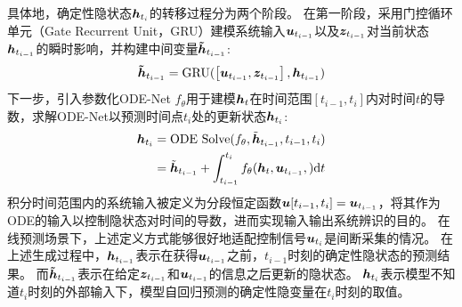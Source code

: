 具体地，确定性隐状态$\boldsymbol{h}_{t_i}$的转移过程分为两个阶段。
在第一阶段，采用门控循环单元（Gate Recurrent Unit，GRU）建模系统输入$\boldsymbol{u}_{t_{i-1}}$以及$\boldsymbol{z}_{t_{i-1}}$对当前状态$\boldsymbol{h}_{t_{i-1}}$的瞬时影响，并构建中间变量$\boldsymbol{\tilde{h}}_{t_{i-1}}$:
\begin{equation}
\thtm  = \text{GRU}(\left [\utm, \ztm\right], \htm)
\label{equ:gru}
\end{equation}
下一步，引入参数化ODE-Net $f_\theta$用于建模$\boldsymbol h_{t}$在时间范围$[t_{i-1},t_{i}]$内对时间$t$的导数，求解ODE-Net以预测时间点$t_i$处的更新状态$\boldsymbol{h}_{t_i}$:
\begin{equation}
\begin{aligned}
   \hti&=\text{ODE Solve}(f_\theta, \tilde{\b{h}}_{t_{i-1}}, t_{i-1}, t_i) \\
   &= \tilde{\b{h}}_{t_{i-1}} + \int_{t_{i-1}}^{t_i}f_\theta(\b h_t, \utm, ) \text{d}t
   \label{equ:ode}
\end{aligned}
\end{equation}
积分时间范围内的系统输入被定义为分段恒定函数$\boldsymbol u[t_{i-1},t_i]=\boldsymbol{u}_{t_{i-1}}$，将其作为ODE的输入以控制隐状态对时间的导数，进而实现输入输出系统辨识的目的。
在线预测场景下，上述定义方式能够很好地适配控制信号$\boldsymbol{u}_{t_i}$是间断采集的情况。
在上述生成过程中，$\boldsymbol{h}_{t_{i-1}}$表示在获得$\boldsymbol{u}_{t_{i-1}}$之前，$t_{i-1}$时刻的确定性隐状态的预测结果。
而$\boldsymbol{\tilde{h}}_{t_{i-1}}$表示在给定$\boldsymbol{z}_{t_{i-1}}$和$\boldsymbol{u}_{t_{i-1}}$的信息之后更新的隐状态。
$\boldsymbol{h}_{t_i}$表示模型不知道$t_{i}$时刻的外部输入下，模型自回归预测的确定性隐变量在$t_i$时刻的取值。

